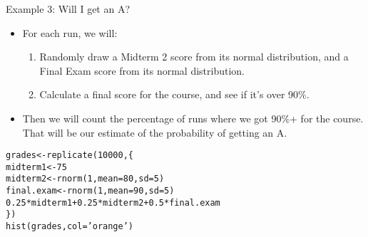 \documentclass{beamer}\usepackage[]{graphicx}\usepackage[]{color}
\makeatletter
\newcommand{\hlnum}[1]{\textcolor[rgb]{0.824,0.412,0.118}{#1}}%
\newcommand{\hlstr}[1]{\textcolor[rgb]{1,0.894,0.71}{#1}}%
\newcommand{\hlopt}[1]{\textcolor[rgb]{1,0.894,0.769}{#1}}%
\newcommand{\hlstd}[1]{\textcolor[rgb]{1,0.894,0.769}{#1}}%
\newcommand{\hlkwb}[1]{\textcolor[rgb]{0.804,0.776,0.451}{#1}}%
\newcommand{\hlkwc}[1]{\textcolor[rgb]{0.78,0.941,0.545}{#1}}%
\newcommand{\hlkwd}[1]{\textcolor[rgb]{1,0.78,0.769}{#1}}%
\newenvironment{kframe}{%
 \def\at@end@of@kframe{}%
 \ifinner\ifhmode%
  \def\at@end@of@kframe{\end{minipage}}%
  \begin{minipage}{\columnwidth}%
 \fi\fi%
 \def\FrameCommand##1{\hskip\@totalleftmargin \hskip-\fboxsep
 \colorbox{shadecolor}{##1}\hskip-\fboxsep
     \hskip-\linewidth \hskip-\@totalleftmargin \hskip\columnwidth}%
 \MakeFramed {\advance\hsize-\width
   \@totalleftmargin\z@ \linewidth\hsize
   \@setminipage}}%
 {\par\unskip\endMakeFramed%
 \at@end@of@kframe}
\newenvironment{knitrout}{}{} %
\makeatother
\begin{document}
\begin{darkframes}
    \begin{frame}{Example 3: Will I get an A?}
      \begin{itemize}[<+->]
        \item For each run, we will:
          \begin{enumerate}[<+->]
            \item Randomly draw a Midterm 2 score from its normal distribution, and a Final Exam score from its normal distribution.
            \item Calculate a final score for the course, and see if it's over 90\%.
          \end{enumerate}
        \item Then we will count the percentage of runs where we got 90\%+ for the course. That will be our estimate of the probability of getting an A.
      \end{itemize}
    \end{frame}

    \begin{frame}[fragile]
      \fontsize{10}{10}\selectfont
\begin{knitrout}
\begin{kframe}
\begin{alltt}
\hlstd{grades} \hlkwb{<-} \hlkwd{replicate}\hlstd{(}\hlnum{10000}\hlstd{, \{}
  \hlstd{midterm1} \hlkwb{<-} \hlnum{75}
  \hlstd{midterm2} \hlkwb{<-} \hlkwd{rnorm}\hlstd{(}\hlnum{1}\hlstd{,} \hlkwc{mean}\hlstd{=}\hlnum{80}\hlstd{,} \hlkwc{sd}\hlstd{=}\hlnum{5}\hlstd{)}
  \hlstd{final.exam} \hlkwb{<-} \hlkwd{rnorm}\hlstd{(}\hlnum{1}\hlstd{,} \hlkwc{mean}\hlstd{=}\hlnum{90}\hlstd{,} \hlkwc{sd}\hlstd{=}\hlnum{5}\hlstd{)}
  \hlnum{0.25}\hlopt{*}\hlstd{midterm1} \hlopt{+} \hlnum{0.25}\hlopt{*}\hlstd{midterm2} \hlopt{+} \hlnum{0.5}\hlopt{*}\hlstd{final.exam}
\hlstd{\})}
\hlkwd{hist}\hlstd{(grades,} \hlkwc{col}\hlstd{=}\hlstr{'orange'}\hlstd{)}
\end{alltt}
\end{kframe}


\end{knitrout}
    \end{frame}


\end{darkframes}
\end{document}
